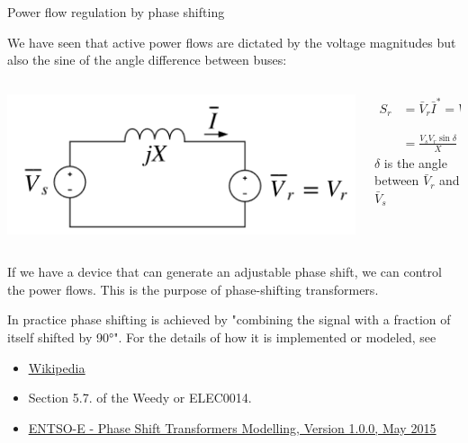 \begin{frame}[allowframebreaks]{Power flow regulation by phase shifting}

We have seen that active power flows are dictated by the voltage magnitudes but also the sine of the angle difference between buses: 

\begin{columns}
    \begin{column}{0.55\textwidth}
        \begin{center}
            \includegraphics[width=\textwidth]{images/power-transfer_AC.png}\\
        \end{center}
    \end{column}
    \begin{column}{0.45\textwidth}
        \begin{align*}
        S_r &= \bar{V}_r\bar{I}^*  = V_r \left(\frac{V_s \angle -\delta - V_r}{-jX}\right) \\\\
            &= \frac{V_s V_r \sin \delta }{X} +j \frac{V_s V_r \cos \delta - V^2_r}{X} 
        \end{align*}
        $\delta$ is the angle between $\bar{V}_r$ and $\bar{V}_s$
    \end{column}
\end{columns}

If we have a device that can generate an adjustable phase shift, we can control the power flows.
This is the purpose of \alert{phase-shifting transformers}.

In practice phase shifting is achieved by "combining the signal with a fraction of itself shifted by 90°".
For the details of how it is implemented or modeled, see 
\begin{itemize}
    \item \href{https://en.wikipedia.org/wiki/Quadrature_booster}{\underline{Wikipedia}}
    \item Section 5.7. of the Weedy or ELEC0014.
    \item \href{https://eepublicdownloads.blob.core.windows.net/public-cdn-container/clean-documents/CIM_documents/Grid_Model_CIM/ENTSOE_CGMES_v2.4.14_28May2014_PSTmodelling.pdf}{\underline{ENTSO-E - Phase Shift Transformers Modelling, Version 1.0.0, May 2015}}
\end{itemize}

\end{frame}

